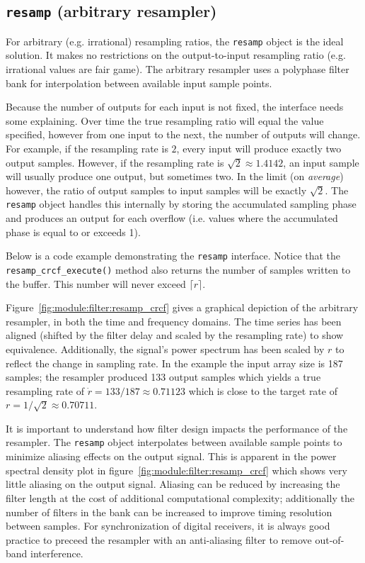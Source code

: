 % 
%
\subsection{{\tt resamp} (arbitrary resampler)}
\label{module:filter:resamp}
For arbitrary (e.g. irrational) resampling ratios, the {\tt resamp}
object is the ideal solution.
It makes no restrictions on the output-to-input resampling ratio
(e.g. irrational values are fair game).
The arbitrary resampler uses a polyphase filter bank for interpolation
between available input sample points.

Because the number of outputs for each input is not fixed, the interface needs
some explaining.
Over time the true resampling ratio will equal the value specified, however
from one input to the next, the number of outputs will change.
For example, if the resampling rate is $2$, every input will produce exactly
two output samples.
However, if the resampling rate is $\sqrt{2} \approx 1.4142$, an input sample
will usually produce one output, but sometimes two.
In the limit (on {\it average}) however, the ratio of output samples to input
samples will be exactly $\sqrt{2}$.
The {\tt resamp} object handles this internally by storing the accumulated
sampling phase and produces an output for each overflow (i.e. values where the
accumulated phase is equal to or exceeds 1).

Below is a code example demonstrating the {\tt resamp} interface.
Notice that the {\tt resamp\_crcf\_execute()} method also returns the number
of samples written to the buffer.
This number will never exceed $\lceil r \rceil$.
%

%
Figure~\ref{fig:module:filter:resamp_crcf} gives a graphical depiction
of the arbitrary resampler, in both the time and frequency domains.
The time series has been aligned (shifted by the filter delay and scaled by
the resampling rate) to show equivalence.
Additionally, the signal's power spectrum has been scaled by $r$ to reflect
the change in sampling rate.
In the example the input array size is 187 samples;
the resampler produced 133 output samples which yields a true resampling
rate of $\dot{r} = 133/187 \approx 0.71123$ which is close to the target
rate of $r = 1/\sqrt{2} \approx 0.70711$.

It is important to understand how filter design impacts the performance of the
resampler.
The {\tt resamp} object interpolates between available sample points to
minimize aliasing effects on the output signal.
This is apparent in the power spectral density plot in
figure~\ref{fig:module:filter:resamp_crcf} which shows very little aliasing on
the output signal.
Aliasing can be reduced by increasing the filter length at the cost of
additional computational complexity;
additionally the number of filters in the bank can be increased to
improve timing resolution between samples.
For synchronization of digital receivers, it is always good practice to
preceed the resampler with an anti-aliasing filter to remove out-of-band
interference.

